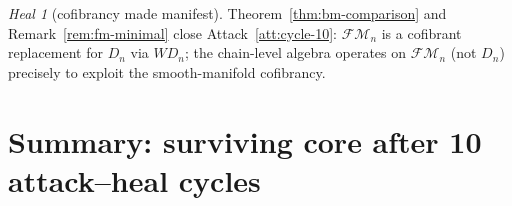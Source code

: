 \documentclass[11pt]{article}
\theoremstyle{definition}
\theoremstyle{remark}
\newtheorem{heal}[theorem]{Heal}
\newcommand{\FM}{\mathcal{FM}}
\newcommand{\Ddisk}{D}
\begin{document}
\begin{heal}[cofibrancy made manifest]
\label{heal:cycle-10}
Theorem~\ref{thm:bm-comparison} and Remark~\ref{rem:fm-minimal}
close Attack~\ref{att:cycle-10}: $\FM_n$ is a cofibrant replacement
for $\Ddisk_n$ via $W \Ddisk_n$; the chain-level algebra operates
on $\FM_n$ (not $\Ddisk_n$) precisely to exploit the smooth-manifold
cofibrancy.
\end{heal}

\section{Summary: surviving core after 10 attack--heal cycles}
\end{document}
